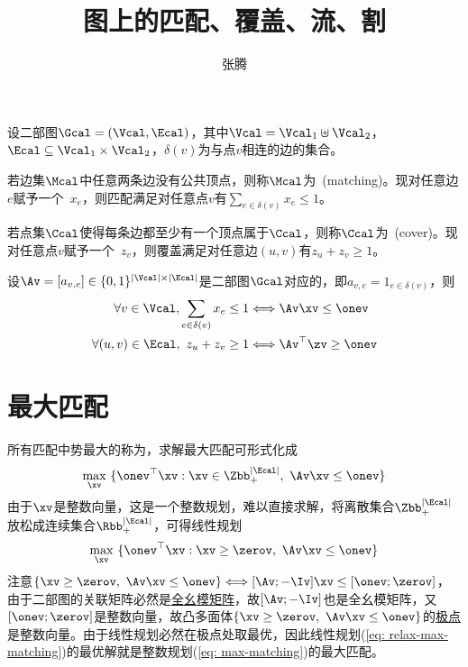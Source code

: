 \documentclass{ctexart}
\begin{document}
\title{\bf{图上的匹配、覆盖、流、割}}
\author{张腾}
\date{}
\maketitle

设二部图$\Gcal = (\Vcal, \Ecal)$，其中$\Vcal = \Vcal_1 \uplus \Vcal_2$，$\Ecal \subseteq \Vcal_1 \times \Vcal_2$，$\delta(v)$为与点$v$相连的边的集合。

若边集$\Mcal$中任意两条边没有公共顶点，则称$\Mcal$为~(matching)。现对任意边$e$赋予一个~$x_e$，则匹配满足对任意点$v$有$\sum_{e \in \delta(v)} x_e \le 1$。

若点集$\Ccal$使得每条边都至少有一个顶点属于$\Ccal$，则称$\Ccal$为~(cover)。现对任意点$v$赋予一个~$z_v$，则覆盖满足对任意边$(u,v)$有$z_u + z_v \ge 1$。

设$\Av = [a_{v,e}] \in \{ 0,1 \}^{|\Vcal| \times |\Ecal|}$是二部图$\Gcal$对应的，即$a_{v,e} = 1_{e \in \delta(v)}$，则
\begin{align*}
    \forall v \in \Vcal, \sum_{e \in \delta(v)} x_e \le 1 & \Longleftrightarrow \Av \xv \le \onev      \\
    \forall (u,v) \in \Ecal, ~ z_u + z_v \ge 1            & \Longleftrightarrow \Av^\top \zv \ge \onev
\end{align*}

\section{最大匹配}

所有匹配中势最大的称为，求解最大匹配可形式化成
\begin{align} \label{eq: max-matching}
    \max_{\xv} ~ \{ \onev^\top \xv : \xv \in \Zbb_+^{|\Ecal|}, ~ \Av \xv \le \onev \}
\end{align}
由于$\xv$是整数向量，这是一个整数规划，难以直接求解，将离散集合$\Zbb_+^{|\Ecal|}$放松成连续集合$\Rbb_+^{|\Ecal|}$，可得线性规划
\begin{align} \label{eq: relax-max-matching}
    \max_{\xv} ~ \{ \onev^\top \xv : \xv \ge \zerov, ~ \Av \xv \le \onev \}
\end{align}
注意$\{ \xv \ge \zerov, ~ \Av \xv \le \onev \} \Longleftrightarrow [\Av; -\Iv] \xv \le [\onev; \zerov]$，由于二部图的关联矩阵必然是\href{https://avanti1980.github.io/notes-on-math/posts/matrix/TU-matrix.html}{全幺模矩阵}，故$[\Av; -\Iv]$也是全幺模矩阵，又$[\onev; \zerov]$是整数向量，故凸多面体$\{ \xv \ge \zerov, ~ \Av \xv \le \onev \}$的\href{https://avanti1980.github.io/notes-on-math/posts/optimization/analysis/extreme-point.html}{极点}是整数向量。由于线性规划必然在极点处取最优，因此线性规划(\ref{eq: relax-max-matching})的最优解就是整数规划(\ref{eq: max-matching})的最大匹配。
\end{document}
